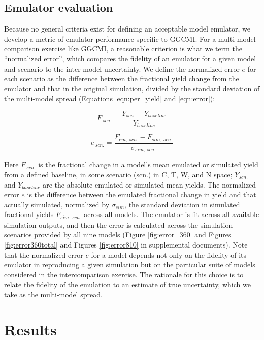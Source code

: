 \documentclass[preprint, 5p, times, twocolumn]{elsarticle}
\begin{document}
\subsection{Emulator evaluation}
Because no general criteria exist for defining an acceptable model emulator, we develop a metric of emulator performance specific to GGCMI. For a multi-model comparison exercise like GGCMI, a reasonable criterion is what we term the ``normalized error'', which compares the fidelity of an emulator for a given model and scenario to the inter-model uncertainty. We define the normalized error $e$ for each scenario as the difference between the fractional yield change from the emulator and that in the original simulation, divided by the standard deviation of the multi-model spread (Equations \ref{eqn:per_yield} and  \ref{eqn:error}):

\begin{equation}
    \label{eqn:per_yield}
    F_{\: scn.}=\frac{Y_{scn.}-Y_{baseline}}{Y_{baseline}}
\end{equation}

\begin{equation}
    \label{eqn:error}
    e_{\: scn.} =\frac{F_{em, \: scn.}-F_{sim, \: scn.}}{\sigma_{sim, \: scn.}}
\end{equation}

Here $F_{\: scn.}$ is the fractional change in a model's mean emulated or simulated yield from a defined baseline, in some scenario (scn.) in C, T, W, and N space; $Y_{scn.}$ and $Y_{baseline}$ are the absolute emulated or simulated mean yields. The normalized error $e$ is the difference between the emulated fractional change in yield and that actually simulated, normalized by $\sigma_{sim}$, the standard deviation in simulated fractional yields $F_{sim,\: scn.}$ across all models. The emulator is fit across all available simulation outputs, and then the error is calculated across the simulation scenarios provided by all nine models (Figure \ref{fig:error_360} and Figures \ref{fig:error360total} and Figures \ref{fig:error810} in supplemental documents). Note that the normalized error $e$ for a model depends not only on the fidelity of its emulator in reproducing a given simulation but on the particular suite of models considered in the intercomparison exercise. The rationale for this choice is to relate the fidelity of the emulation to an estimate of true uncertainty, which we take as the multi-model spread. 

\section{Results}
\label{S:3}
\end{document}
